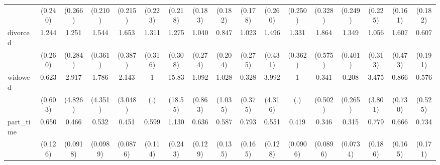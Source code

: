 {\begin{tabular}{l*{16}{c}}
                    &     (0.240)         &     (0.266)         &     (0.210)         &     (0.215)         &     (0.223)         &     (0.218)         &     (0.183)         &     (0.182)         &     (0.178)         &     (0.260)         &     (0.250)         &     (0.328)         &     (0.249)         &     (0.225)         &     (0.161)         &     (0.182)         \\
[1em]
divorced            &       1.244         &       1.251         &       1.544         &       1.653\sym{*}  &       1.311         &       1.275         &       1.040         &       0.847         &       1.023         &       1.496         &       1.331         &       1.864\sym{*}  &       1.349         &       1.056         &       1.607         &       0.607         \\
                    &     (0.260)         &     (0.284)         &     (0.361)         &     (0.387)         &     (0.316)         &     (0.308)         &     (0.274)         &     (0.204)         &     (0.275)         &     (0.431)         &     (0.362)         &     (0.575)         &     (0.401)         &     (0.313)         &     (0.473)         &     (0.191)         \\
[1em]
widowed             &       0.623         &       2.917         &       1.786         &       2.143         &           1         &       15.83\sym{*}  &       1.092         &       1.028         &       0.328         &       3.992         &           1         &       0.341         &       0.208         &       3.475         &       0.866         &       0.576         \\
                    &     (0.603)         &     (4.826)         &     (4.351)         &     (3.048)         &         (.)         &     (18.55)         &     (0.863)         &     (1.035)         &     (0.375)         &     (4.316)         &         (.)         &     (0.502)         &     (0.265)         &     (3.801)         &     (0.730)         &     (0.525)         \\
[1em]
part\_time           &       0.650\sym{*}  &       0.466\sym{***}&       0.532\sym{***}&       0.451\sym{***}&       0.599\sym{**} &       1.130         &       0.636\sym{*}  &       0.587\sym{*}  &       0.793         &       0.551\sym{*}  &       0.419\sym{***}&       0.346\sym{***}&       0.315\sym{***}&       0.779         &       0.666         &       0.734         \\
                    &     (0.126)         &    (0.0918)         &    (0.0989)         &    (0.0876)         &     (0.114)         &     (0.243)         &     (0.129)         &     (0.135)         &     (0.165)         &     (0.128)         &    (0.0906)         &    (0.0896)         &    (0.0734)         &     (0.186)         &     (0.165)         &     (0.171)         \\

\end{tabular}}
